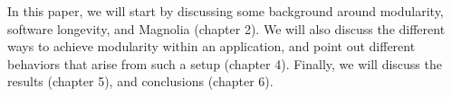 In this paper, we will start by discussing some background around modularity,
software longevity, and Magnolia (chapter 2). We will also discuss the different
ways to achieve modularity within an application, and point out different
behaviors that arise from such a setup (chapter 4). Finally, we will discuss the
results (chapter 5), and conclusions (chapter 6).
